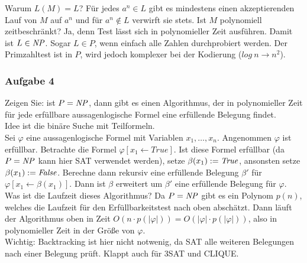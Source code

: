     Warum $L(M) = L$? Für jedes $a^{n} \in L$ gibt es mindestens einen akzeptierenden Lauf von $M$ auf $a^{n}$ und für $a^{n} \not\in L$ verwirft sie stets.
    Ist $M$ polynomiell zeitbeschränkt? Ja, denn Test lässt sich in polynomieller Zeit ausführen. Damit ist $L \in \mathit{NP}$. Sogar $L \in P$, wenn einfach alle Zahlen durchprobiert werden.
    Der Primzahltest ist in $P$, wird jedoch komplexer bei der Kodierung ($log\ n \to n^{2}$).


\subsubsection*{Aufgabe 4}
    Zeigen Sie: ist $P = \mathit{NP}$, dann gibt es einen Algorithmus, der in polynomieller Zeit für jede erfüllbare aussagenlogische Formel eine erfüllende Belegung findet. \\

    \LOES Idee ist die binäre Suche mit Teilformeln. \\
    Sei $\varphi$ eine aussagenlogische Formel mit Variablen $x_{1}, \dots, x_{n}$. Angenommen $\varphi$ ist erfüllbar. Betrachte die Formel $\varphi [x_{1} \leftarrow True ]$. Ist diese Formel erfüllbar (da $P = \mathit{NP}$ kann hier SAT verwendet werden), setze $\beta(x_{1}) := \mathit{True}$, ansonsten setze $\beta(x_{1}) := \mathit{False}$. Berechne dann rekursiv eine erfüllende Belegung $\beta'$ für $\varphi [x_{1} \leftarrow \beta(x_{1})]$. Dann ist $\beta$ erweitert um $\beta'$ eine erfüllende Belegung für $\varphi$. \\

    Was ist die Laufzeit dieses Algorithmus? Da $P = \mathit{NP}$ gibt es ein Polynom $p(n)$, welches die Laufzeit für den Erfüllbarkeitstest nach oben abschätzt. Dann läuft der Algorithmus oben in Zeit $O(n \cdot p(|\varphi|)) = O(|\varphi| \cdot p(|\varphi|))$, also in polynomieller Zeit in der Größe von $\varphi$. \\

    Wichtig: Backtracking ist hier nicht notwenig, da SAT alle weiteren Belegungen nach einer Belegung prüft.
    Klappt auch für 3SAT und CLIQUE.
